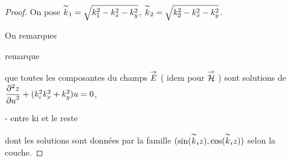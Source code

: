    \begin{proof}

      On pose \(\kk_1 = \sqrt{k_1^2 - k_x^2 - k_y^2}\),  \(\kk_2 = \sqrt{k_2^2 - k_x^2 - k_y^2}\).

      On remarques
      \begin{REM}
  remarque
\end{REM} que toutes les composantes du champs \(\vE\) ( idem pour \(\vH\) ) sont solutions de \(\ddr[2]{u}{z} + (k_i^2 k_x^2 + k_y^2) u = 0 \),
\begin{REM}
   - entre ki et le reste
\end{REM} dont les solutions sont données par la famille \((\sin(\kk_i z),\cos(\kk_i z))\) selon la couche.




\end{proof}
